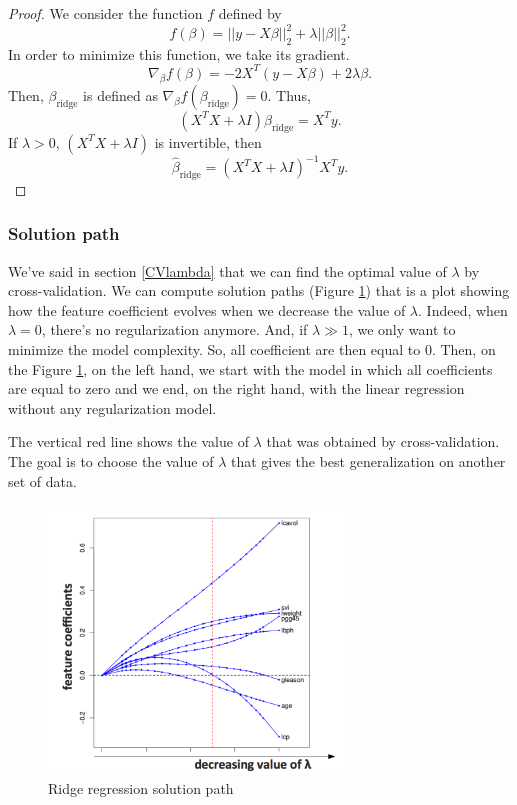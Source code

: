\documentclass[a4paper,12pt]{article}
\begin{document}
\begin{proof}
We consider the function $f$ defined by
\[ f(\beta) = ||y - X\beta||_2^2 + \lambda ||\beta||_2^2.\]
In order to minimize this function, we take its gradient.
\[ \nabla_{\beta}f(\beta) = -2X^T (y-X\beta) + 2\lambda \beta.\]
Then, $\beta_\text{ridge}$ is defined as $\nabla_{\beta}f(\beta_{\text{ridge}}) = 0$. Thus,
\[ (X^TX+\lambda I)\beta_\text{ridge} = X^T y.\]
If $\lambda > 0$, $(X^T X + \lambda I)$ is invertible, then
\[ \hat{\beta}_\text{ridge} = (X^T X+ \lambda I)^{-1} X^T y. \]
\end{proof}

\subsubsection{Solution path}
\label{SectionSolutionPathRR}
We've said in section \ref{CVlambda} that we can find the optimal value of $\lambda$ by cross-validation. We can compute solution paths (Figure \ref{SolutionPathRR}) that is a plot showing how the feature coefficient evolves when we decrease the value of $\lambda$. Indeed, when $\lambda = 0$, there's no regularization anymore. And, if $\lambda \gg 1$, we only want to minimize the model complexity. So, all coefficient are then equal to $0$. Then, on the Figure \ref{SolutionPathRR}, on the left hand, we start with the model in which all coefficients are equal to zero and we end, on the right hand, with the linear regression without any regularization model.

The vertical red line shows the value of $\lambda$ that was obtained by cross-validation. The goal is to choose the value of $\lambda$ that gives the best generalization on another set of data.
\begin{figure}[!h]
\centerline{
\includegraphics[width = 0.7\textwidth]{figures/solution_path_ridge_regression.png}}
\caption{Ridge regression solution path}
\label{SolutionPathRR}
\end{figure}
\end{document}
